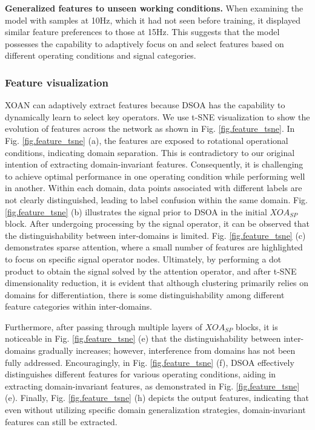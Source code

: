 \documentclass[lettersize,journal]{IEEEtran}
\begin{document}
\textbf{Generalized features to unseen working conditions.}
When examining the model with samples at 10Hz, which it had not seen before training, it displayed similar feature preferences to those at 15Hz. This suggests that the model possesses the capability to adaptively focus on and select features based on different operating conditions and signal categories.


\subsubsection{Feature visualization} XOAN can adaptively extract features because DSOA has the capability to dynamically learn to select key operators. We use t-SNE visualization to show the evolution of features across the network as shown in Fig. \ref{fig.feature_tsne}. In Fig. \ref{fig.feature_tsne} (a), the features are exposed to rotational operational conditions, indicating domain separation. This is contradictory to our original intention of extracting domain-invariant features. Consequently, it is challenging to achieve optimal performance in one operating condition while performing well in another. Within each domain, data points associated with different labels are not clearly distinguished, leading to label confusion within the same domain. Fig. \ref{fig.feature_tsne} (b) illustrates the signal prior to DSOA in the initial $XOA_{SP}$ block. After undergoing processing by the signal operator, it can be observed that the distinguishability between inter-domains is limited. Fig. \ref{fig.feature_tsne} (c) demonstrates sparse attention, where a small number of features are highlighted to focus on specific signal operator nodes. Ultimately, by performing a dot product to obtain the signal solved by the attention operator, and after t-SNE dimensionality reduction, it is evident that although clustering primarily relies on domains for differentiation, there is some distinguishability among different feature categories within inter-domains.

Furthermore, after passing through multiple layers of $XOA_{SP}$ blocks, it is noticeable in Fig. \ref{fig.feature_tsne} (e) that the distinguishability between inter-domains gradually increases; however, interference from domains has not been fully addressed. Encouragingly, in Fig. \ref{fig.feature_tsne} (f), DSOA effectively distinguishes different features for various operating conditions, aiding in extracting domain-invariant features, as demonstrated in Fig. \ref{fig.feature_tsne} (e). Finally, Fig. \ref{fig.feature_tsne} (h) depicts the output features, indicating that even without utilizing specific domain generalization strategies, domain-invariant features can still be extracted.
\end{document}
